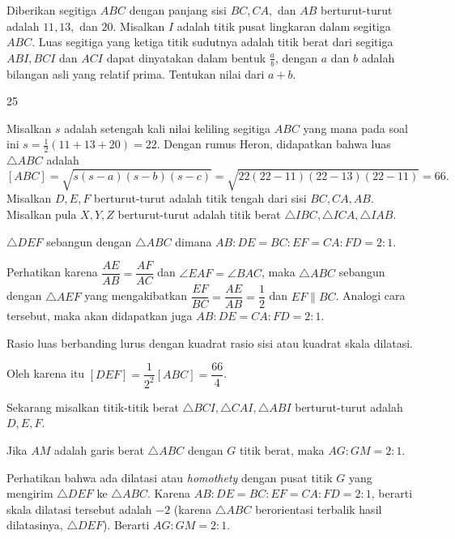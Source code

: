 \documentclass[11pt]{scrartcl}
\begin{document}
	\begin{soaljawab}
		Diberikan segitiga $ABC$ dengan panjang sisi $BC,CA,$ dan $AB$ berturut-turut adalah $11,13,$ dan $20$. Misalkan $I$ adalah titik pusat lingkaran dalam segitiga $ABC$. Luas segitiga yang ketiga titik sudutnya adalah titik berat dari segitiga $ABI,BCI$ dan $ACI$ dapat dinyatakan dalam bentuk $\frac{a}{b}$, dengan $a$ dan $b$ adalah bilangan asli yang relatif prima. Tentukan nilai dari $a+b$.
		
		\begin{jawaban}
		25
		\end{jawaban}
		\begin{solusi}
		Misalkan $s$ adalah setengah kali nilai keliling segitiga $ABC$ yang mana pada soal ini $s = \frac12(11+13+20) = 22$. Dengan rumus Heron, didapatkan bahwa luas $\triangle ABC$ adalah $$[ABC]=\sqrt{s(s-a)(s-b)(s-c)}=\sqrt{22(22-11)(22-13)(22-11)}=66.$$
		Misalkan $D,E,F$ berturut-turut adalah titik tengah dari sisi $BC,CA,AB$. Misalkan pula $X,Y,Z$ berturut-turut adalah titik berat $\triangle IBC,\triangle ICA,\triangle IAB$.
		\begin{lemmarev}[1]
				$\triangle DEF$ sebangun dengan $\triangle ABC$ dimana $AB:DE=BC:EF=CA:FD=2:1$.
				
				\begin{buktilemma}
					Perhatikan karena $\dfrac{AE}{AB}=\dfrac{AF}{AC}$ dan $\angle EAF = \angle BAC$, maka $\triangle ABC$ sebangun dengan $\triangle AEF$ yang mengakibatkan $\dfrac{EF}{BC}=\dfrac{AE}{AB}=\dfrac{1}{2}$ dan $EF \parallel BC$. Analogi cara tersebut, maka akan didapatkan juga $AB:DE=CA:FD=2:1$.
				\end{buktilemma}
			\end{lemmarev}
		
		
		\begin{lemmarev}[2]
				Rasio luas berbanding lurus dengan kuadrat rasio sisi atau kuadrat skala dilatasi.
		\end{lemmarev}
		Oleh karena itu  $[DEF]=\dfrac{1}{2^2}[ABC]=\dfrac{66}{4}$.
		
		Sekarang misalkan titik-titik berat $\triangle BCI, \triangle CAI, \triangle ABI$ berturut-turut adalah $D,E,F$. 
		
		\begin{lemmarev}[3]
			Jika $AM$ adalah garis berat $\triangle ABC$ dengan $G$ titik berat, maka $AG:GM = 2:1$.
			\begin{buktilemma}
			Perhatikan bahwa ada dilatasi atau \textit{ homothety } dengan pusat titik $G$ yang mengirim $\triangle DEF$ ke $\triangle ABC$. Karena $AB:DE=BC:EF=CA:FD=2:1$, berarti skala dilatasi tersebut adalah $-2$ (karena $\triangle ABC$ berorientasi terbalik hasil dilatasinya, $\triangle DEF$). Berarti $AG:GM=2:1$.
			\end{buktilemma}
		\end{lemmarev}
		

\end{solusi}
\end{soaljawab}
\end{document}

